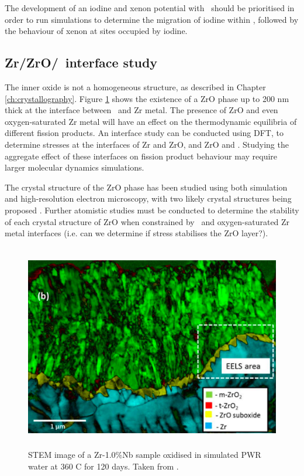 The development of an iodine and xenon potential with \zirconia\ should be prioritised in order to run simulations to determine the migration of iodine within \zirconia, followed by the behaviour of xenon at sites occupied by iodine.

\subsection{Zr/ZrO/\zirconia\ interface study}

The inner oxide is not a homogeneous structure, as described in Chapter \ref{ch:crystallography}. Figure \ref{fig:zro_interface} shows the existence of a ZrO phase up to 200 nm thick at the interface between \zirconia\ and Zr metal. The presence of ZrO and even oxygen-saturated Zr metal will have an effect on the thermodynamic equilibria of different fission products. An interface study can be conducted using DFT, to determine stresses at the interfaces of Zr and ZrO, and ZrO and \zirconia . Studying the aggregate effect of these interfaces on fission product behaviour may require larger molecular dynamics simulations. 

The crystal structure of the ZrO phase has been studied using both simulation and high-resolution electron microscopy, with two likely crystal structures being proposed \cite{Nicholls2015}. Further atomistic studies must be conducted to determine the stability of each crystal structure of ZrO when constrained by \zirconia\ and oxygen-saturated Zr metal interfaces (i.e. can we determine if stress stabilises the ZrO layer?).

\begin{figure}[ht] %
    \centering
    \includegraphics[height=9cm]{images/zro_interface.png}
    \caption[STEM image of a Zr-1.0\%Nb sample oxidised in simulated PWR water at 360 C for 120 days.]{STEM image of a Zr-1.0\%Nb sample oxidised in simulated PWR water at 360 C for 120 days. Taken from \cite{inproceedings}.}
    \label{fig:zro_interface}
\end{figure}

